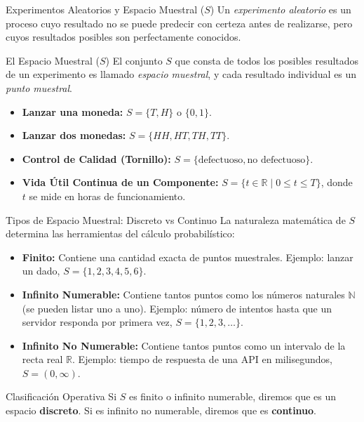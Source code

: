 \documentclass[10pt,aspectratio=169]{beamer}
\begin{document}
\begin{frame}{Experimentos Aleatorios y Espacio Muestral ($S$)}
  Un \emph{experimento aleatorio} es un proceso cuyo resultado no se puede predecir con certeza antes de realizarse, pero cuyos resultados posibles son perfectamente conocidos. \pause

  \vspace{0.3em}
  \begin{block}{El Espacio Muestral ($S$)}
    El conjunto $S$ que consta de todos los posibles resultados de un experimento es llamado \emph{espacio muestral}, y cada resultado individual es un \emph{punto muestral}.
  \end{block}

  \vspace{0.3em}
  \pause
  \begin{itemize}
    \item \textbf{Lanzar una moneda:} $S = \{T, H\}$ o $\{0, 1\}$. \pause
    \item \textbf{Lanzar dos monedas:} $S = \{HH, HT, TH, TT\}$. \pause
    \item \textbf{Control de Calidad (Tornillo):} $S = \{\text{defectuoso}, \text{no defectuoso}\}$. \pause
    \item \textbf{Vida Útil Continua de un Componente:} $S = \{t \in \mathbb{R} \mid 0 \leq t \leq T\}$, donde $t$ se mide en horas de funcionamiento.
  \end{itemize}
\end{frame}

\begin{frame}{Tipos de Espacio Muestral: Discreto vs Continuo}
  La naturaleza matemática de $S$ determina las herramientas del cálculo probabilístico: \pause

  \vspace{0.4em}
  \begin{itemize}
    \item \textbf{Finito:} Contiene una cantidad exacta de puntos muestrales. Ejemplo: lanzar un dado, $S = \{1, 2, 3, 4, 5, 6\}$. \pause
    \item \textbf{Infinito Numerable:} Contiene tantos puntos como los números naturales $\mathbb{N}$ (se pueden listar uno a uno). Ejemplo: número de intentos hasta que un servidor responda por primera vez, $S = \{1, 2, 3, \dots\}$. \pause
    \item \textbf{Infinito No Numerable:} Contiene tantos puntos como un intervalo de la recta real $\mathbb{R}$. Ejemplo: tiempo de respuesta de una API en milisegundos, $S = (0, \infty)$.
  \end{itemize}

  \vspace{0.4em}
  \pause
  \begin{alertblock}{Clasificación Operativa}
    Si $S$ es finito o infinito numerable, diremos que es un espacio \textbf{discreto}. Si es infinito no numerable, diremos que es \textbf{continuo}.
  \end{alertblock}
\end{frame}
\end{document}
